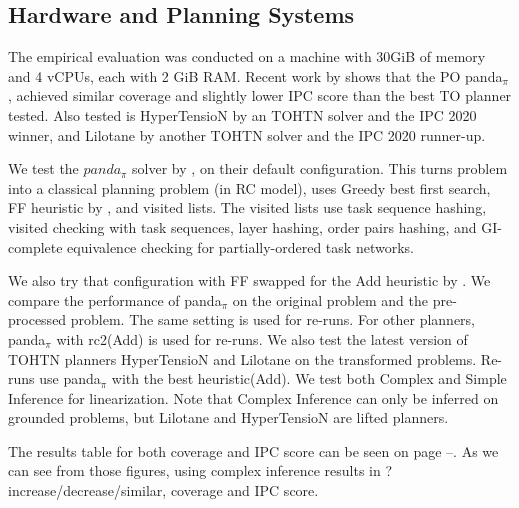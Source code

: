 \documentclass[letterpaper]{article} %
\begin{document}
\subsection{Hardware and Planning Systems}
The empirical evaluation was conducted on a machine with 30GiB of memory and 4 vCPUs, each with 2 GiB RAM. Recent work by \cite{HTN2SAS} shows that the PO panda$_\pi$, achieved similar coverage and slightly lower IPC score than the best TO planner tested. Also tested is HyperTensioN by \cite{hypertension} an TOHTN solver and the IPC 2020 winner, and Lilotane by \cite{Lilotane} another TOHTN solver and the IPC 2020 runner-up. 

We test the $panda_{\pi}$ solver by \cite{useClassicalHuristicICAPS18,useClassicalHeuristicIJCAI19,progressionsearchJAIR20}, on their default configuration. This turns problem into a classical planning problem (in RC model), uses Greedy best first search, FF heuristic by \cite{FF}, and visited lists. The visited lists use task sequence hashing, visited checking with task sequences, layer hashing, order pairs hashing, and GI-complete equivalence checking for partially-ordered task networks.



We also try that configuration with FF swapped for the Add heuristic by \cite{Add}.
We compare the performance of panda$_\pi$ on the original problem and the pre-processed problem. The same setting is used for re-runs. For other planners, panda$_\pi$ with rc2(Add) is used for re-runs. We also test the latest version of TOHTN planners HyperTensioN and Lilotane on the transformed problems. Re-runs use panda$_{\pi}$ with the best heuristic(Add). We test both Complex and Simple Inference for linearization. Note that Complex Inference can only be inferred on grounded problems, but Lilotane and HyperTensioN are lifted planners.

The results table for both coverage and IPC score can be seen on page \pageref{table:GroundedSimpleIPC}--\pageref{table:GroundedComplexIPC}.
As we can see from those figures, using complex inference results in ?  increase/decrease/similar, coverage and IPC score.
\end{document}
